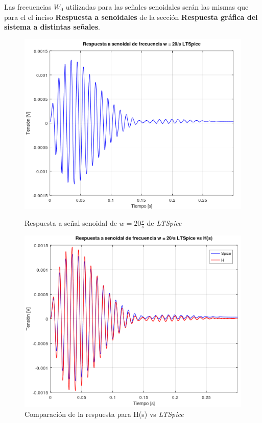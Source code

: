 \documentclass[11pt,a4paper]{report}
\begin{document}
Las frecuencias $W_{0}$ utilizadas para las señales senoidales serán las mismas que para el el inciso \textbf{Respuesta a senoidales} de la sección \textbf{Respuesta gráfica del sistema a distintas señales}.

\begin{figure}[h!]
\centering
\includegraphics[scale=0.8]{rtaSenoidalBajoSpice.png}
\caption{Respuesta a señal senoidal de $w = 20 \frac{r}{s}$ de \textit{LTSpice}}
\includegraphics[scale=0.8]{rtaSenoidalBajoSpiceComp.png}
\caption{Comparación de la respuesta para H(s) vs \textit{LTSpice}}
\end{figure}
\newpage 
\end{document}
